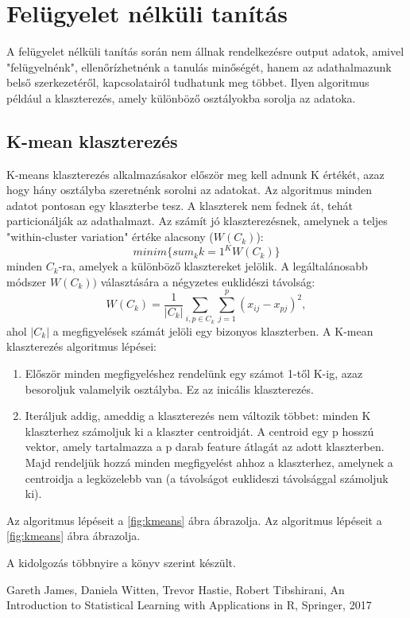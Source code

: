 \documentclass[12pt]{article}
\theoremstyle{plain}
\begin{document}
\section{Felügyelet nélküli tanítás}
A felügyelet nélküli tanítás során nem állnak rendelkezésre output adatok, amivel "felügyelnénk", ellenőrízhetnénk a tanulás minőségét, hanem az adathalmazunk belső szerkezetéről, kapcsolatairól tudhatunk meg többet. Ilyen algoritmus például a klaszterezés, amely különböző osztályokba sorolja az adatoka. 

\subsection{K-mean klaszterezés}
K-means klaszterezés alkalmazásakor először meg kell adnunk K értékét, azaz hogy hány osztályba szeretnénk sorolni az adatokat. Az algoritmus minden adatot pontosan egy klaszterbe tesz. A klaszterek nem fednek át, tehát particionálják az adathalmazt. Az számít jó klaszterezésnek, amelynek a teljes "within-cluster variation" értéke alacsony ($W(C_k)$): $$minim \{sum_k{k=1}^K W(C_k)\}$$ minden $C_k$-ra, amelyek a különböző klasztereket jelölik. A legáltalánosabb módszer $W(C_k))$ választására a négyzetes euklidészi távolság: $$ W(C_k)=\frac{1}{|C_k|} \sum_{i, p \in C_k} \sum_{j=1}^p (x_{ij} - x_{pj})^2, $$ ahol $|C_k|$ a megfigyelések számát jelöli egy bizonyos klaszterben. 
A K-mean klaszterezés algoritmus lépései:
\begin{enumerate}
    \item Először minden megfigyeléshez rendelünk egy számot 1-től K-ig, azaz besoroljuk valamelyik osztályba. Ez az inicális klaszterezés. 
    \item Iteráljuk addig, ameddig a klaszterezés nem változik többet: minden K klaszterhez számoljuk ki a klaszter centroidját. A centroid egy p hosszú vektor, amely tartalmazza a p darab feature átlagát az adott klaszterben. Majd rendeljük hozzá minden megfigyelést ahhoz a klaszterhez, amelynek a centroidja a legközelebb van (a távolságot euklideszi távolsággal számoljuk ki). 
\end{enumerate}

Az algoritmus lépéseit a \ref{fig:kmeans} ábra ábrazolja. 
Az algoritmus lépéseit a \ref{fig:kmeans} ábra ábrazolja. 

A kidolgozás többnyire a \cite{minden} könyv szerint készült. 

\begin{thebibliography}{Nature}

Gareth James, Daniela Witten, Trevor Hastie, Robert Tibshirani, An Introduction to Statistical Learning with Applications in R, Springer, 2017


\end{thebibliography}
\end{document}

